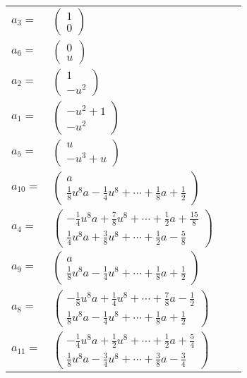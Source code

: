 \documentclass[1p]{elsarticle_modified}
\theoremstyle{definition}
\begin{document}
\begin{tabular}{m{7pt} m{180pt} m{7pt} m{180pt} }
\flushright $a_{3}=$&$\begin{pmatrix}1\\0\end{pmatrix}$ \\
\flushright $a_{6}=$&$\begin{pmatrix}0\\u\end{pmatrix}$ \\
\flushright $a_{2}=$&$\begin{pmatrix}1\\- u^2\end{pmatrix}$ \\
\flushright $a_{1}=$&$\begin{pmatrix}- u^2+1\\- u^2\end{pmatrix}$ \\
\flushright $a_{5}=$&$\begin{pmatrix}u\\- u^3+u\end{pmatrix}$ \\
\flushright $a_{10}=$&$\begin{pmatrix}a\\\frac{1}{8} u^8 a-\frac{1}{4} u^8+\cdots+\frac{1}{8} a+\frac{1}{2}\end{pmatrix}$ \\
\flushright $a_{4}=$&$\begin{pmatrix}-\frac{1}{4} u^8 a+\frac{7}{8} u^8+\cdots+\frac{1}{2} a+\frac{15}{8}\\\frac{1}{4} u^8 a+\frac{3}{8} u^8+\cdots+\frac{1}{2} a-\frac{5}{8}\end{pmatrix}$ \\
\flushright $a_{9}=$&$\begin{pmatrix}a\\\frac{1}{8} u^8 a-\frac{1}{4} u^8+\cdots+\frac{1}{8} a+\frac{1}{2}\end{pmatrix}$ \\
\flushright $a_{8}=$&$\begin{pmatrix}-\frac{1}{8} u^8 a+\frac{1}{4} u^8+\cdots+\frac{7}{8} a-\frac{1}{2}\\\frac{1}{8} u^8 a-\frac{1}{4} u^8+\cdots+\frac{1}{8} a+\frac{1}{2}\end{pmatrix}$ \\
\flushright $a_{11}=$&$\begin{pmatrix}-\frac{1}{4} u^8 a+\frac{1}{2} u^8+\cdots+\frac{1}{2} a+\frac{5}{4}\\\frac{1}{8} u^8 a-\frac{3}{4} u^8+\cdots+\frac{3}{8} a-\frac{3}{4}\end{pmatrix}$ \\

\end{tabular}
\end{document}
